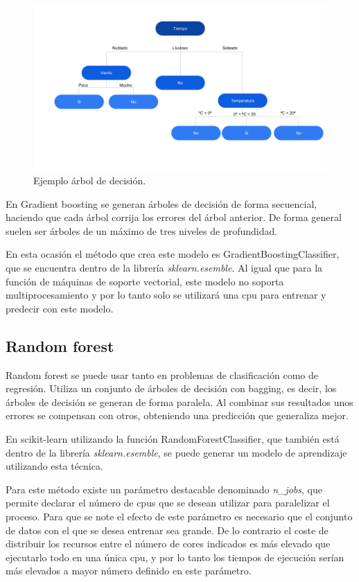 \documentclass[a4paper, 12pt]{book}
\begin{document}
\begin{figure}[h!]
  \centering
  \includegraphics[width=14cm, keepaspectratio]{img/ejemplo_adecision.png}
  \caption{Ejemplo árbol de decisión.}\label{fig:ejemplo_adecision}
\end{figure}

En Gradient boosting se generan árboles de decisión de forma secuencial, haciendo que cada árbol corrija los errores del árbol anterior. De forma general suelen ser árboles de un máximo de tres niveles de profundidad.

En esta ocasión el método que crea este modelo es GradientBoostingClassifier\cite{GradientTreeBDoc}, que se encuentra dentro de la librería \textit{sklearn.esemble}. Al igual que para la función de máquinas de soporte vectorial, este modelo no soporta multiprocesamiento y por lo tanto solo se utilizará una cpu para entrenar y predecir con este modelo.

\subsection{Random forest}
\label{subsec:random_forest}

Random forest se puede usar tanto en problemas de clasificación como de regresión. Utiliza un conjunto de árboles de decisión con bagging, es decir, los árboles de decisión se generan de forma paralela. Al combinar sus resultados unos errores se compensan con otros, obteniendo una predicción que generaliza mejor.

En scikit-learn utilizando la función RandomForestClassifier\cite{RandomForestDoc}, que también está dentro de la librería \textit{sklearn.esemble}, se puede generar un modelo de aprendizaje utilizando esta técnica.

Para este método existe un parámetro destacable denominado \textit{n\_jobs}, que permite declarar el número de cpus que se desean utilizar para paralelizar el proceso. Para que se note el efecto de este parámetro es necesario que el conjunto de datos con el que se desea entrenar sea grande. De lo contrario el coste de distribuir los recursos entre el número de cores indicados es más elevado que ejecutarlo todo en una única cpu, y por lo tanto los tiempos de ejecución serían más elevados a mayor número definido en este parámetro.
\end{document}

